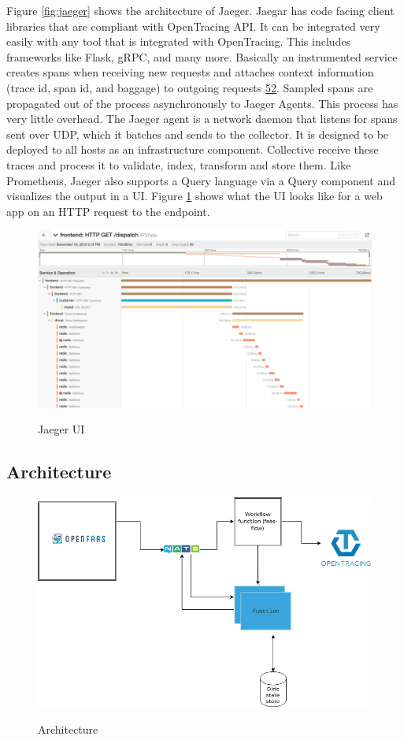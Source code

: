 \documentclass[12pt,titlepage]{article}
\begin{document}
Figure \ref{fig:jaeger} shows the architecture of Jaeger. Jaegar has code facing client libraries
that are compliant with OpenTracing API. It can be integrated very easily with
any tool that is integrated with OpenTracing. This includes frameworks like
Flask, gRPC, and many more. Basically an instrumented service creates spans when
receiving new requests and attaches context information (trace id, span id, and
baggage) to outgoing requests \hyperref[ref:52]{52}. Sampled spans are propagated out of
the process asynchronously to Jaeger Agents. This process has very little
overhead. The Jaeger agent is a network daemon that listens for spans sent over
UDP, which it batches and sends to the collector. It is designed to be deployed
to all hosts as an infrastructure component. Collective receive these traces and
process it to validate, index, transform and store them. Like Prometheus, Jaeger
also supports a Query language via a Query component and visualizes the output
in a UI. Figure \ref{fig:jaeger_traces} shows what the UI looks like for a web app on an HTTP request to
the endpoint. 
\begin{figure}[!h]
    \caption{Jaeger UI}
    \centering
    \includegraphics[width=130mm]{./thesis_images/jaeger_traces.png}
    \label{fig:jaeger_traces}
\end{figure}

\subsection{Architecture}
\label{sec:org38bbd1d}
\begin{figure}[!h]
    \caption{Architecture}
    \centering
    \includegraphics[width=130mm]{./thesis_images/architecture.png}
    \label{fig:arch}
\end{figure}
\end{document}
